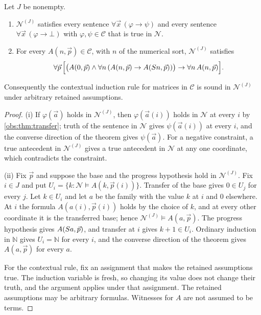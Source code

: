 \begin{corollary}
\label{obs:cor:power-axioms}
Let $J$ be nonempty.
\begin{enumerate}[label=(\roman*)]
\item $\mathcal{N}^{(J)}$ satisfies every sentence
$\forall\vec x\,(\varphi\to\psi)$ and every sentence
$\forall\vec x\,(\varphi\to\bot)$ with $\varphi,\psi\in\mathcal{C}$ that is
true in $\mathcal{N}$.
\item For every $A(n,\vec p)\in\mathcal{C}$, with $n$ of the numerical sort,
$\mathcal{N}^{(J)}$ satisfies
\[
\forall\vec p\,\Bigl[\bigl(A(0,\vec p)\wedge\forall n\,(A(n,\vec p)\to A(S n,\vec p))\bigr)\to\forall n\,A(n,\vec p)\Bigr].
\]
\end{enumerate}
Consequently the contextual induction rule for matrices in $\mathcal{C}$ is
sound in $\mathcal{N}^{(J)}$ under arbitrary retained assumptions.
\end{corollary}

\begin{proof}
(i) If $\varphi(\vec a)$ holds in $\mathcal{N}^{(J)}$, then
$\varphi(\vec a(i))$ holds in $\mathcal{N}$ at every $i$ by
\cref{obs:thm:transfer}; truth of the sentence in $\mathcal{N}$ gives
$\psi(\vec a(i))$ at every $i$, and the converse direction of the theorem gives
$\psi(\vec a)$. For a negative constraint, a true antecedent in
$\mathcal{N}^{(J)}$ gives a true antecedent in $\mathcal{N}$ at any one
coordinate, which contradicts the constraint.

(ii) Fix $\vec p$ and suppose the base and the progress hypothesis hold in
$\mathcal{N}^{(J)}$. Fix $i\in J$ and put
$U_i=\{k:\mathcal{N}\models A(k,\vec p(i))\}$. Transfer of the base gives
$0\in U_j$ for every $j$. Let $k\in U_i$ and let $a$ be the family with the
value $k$ at $i$ and $0$ elsewhere. At $i$ the formula $A(a(i),\vec p(i))$
holds by the choice of $k$, and at every other coordinate it is the transferred
base; hence $\mathcal{N}^{(J)}\models A(a,\vec p)$. The progress hypothesis
gives $A(S a,\vec p)$, and transfer at $i$ gives $k+1\in U_i$. Ordinary
induction in $\mathbb{N}$ gives $U_i=\mathbb{N}$ for every $i$, and the
converse direction of the theorem gives $A(a,\vec p)$ for every $a$.

For the contextual rule, fix an assignment that makes the retained assumptions
true. The induction variable is fresh, so changing its value does not change
their truth, and the argument applies under that assignment. The retained
assumptions may be arbitrary formulas. Witnesses for $A$ are not assumed to be
terms.
\end{proof}

